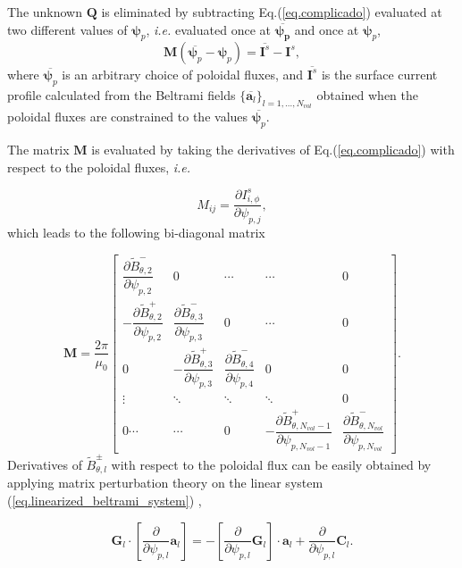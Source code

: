 The unknown $\mathbf{Q}$ is eliminated by subtracting Eq.(\ref{eq.complicado}) evaluated at two different values of $\bm{\psi}_p$, \textit{i.e.} evaluated once at $\overbar{\bm{\psi_p}}$ and once at $\bm{\psi}_p$,
\begin{equation}
    \mathbf{M} (\overbar{\bm{\psi}_p} - \bm{\psi}_p) = \overbar{\bm{I}^{s}} - \bm{I}^{s}, \label{eq.psip_diff}
\end{equation}
where $\overbar{\bm{\psi}_p}$ is an arbitrary choice of poloidal fluxes, and $\overbar{\bm{I}^s}$ is the surface current profile calculated from the Beltrami fields $\{\overbar{\mathbf{a}_l}\}_{l=1,\ldots,N_{vol}}$ obtained when the poloidal fluxes are constrained to the values $\overbar{\bm{\psi}_p}$.

The matrix $\mathbf{M}$ is evaluated by taking the derivatives of Eq.(\ref{eq.complicado}) with respect to the poloidal fluxes, \textit{i.e.}

\begin{equation}
    M_{ij} = \frac{\partial I^s_{i,\phi}}{\partial \psi_{p,j}},\label{eq.coef_M}
\end{equation}
which leads to the following bi-diagonal matrix

\begin{equation}
    \mathbf{M} = \frac{2\pi}{\mu_0} \begin{bmatrix}\dfrac{\partial \tilde{B}^-_{\theta,2}}{\partial{\psi_{p,2}}} & 0 & \cdots & \cdots  & 0 \\
    -\dfrac{\partial \tilde{B}^+_{\theta,2}}{\partial{\psi_{p,2}}} & \dfrac{\partial \tilde{B}^-_{\theta,3}}{\partial{\psi_{p,3}}} & 0  & \cdots & 0\\
    0 & -\dfrac{\partial \tilde{B}^+_{\theta,3}}{\partial{\psi_{p,3}}} & \dfrac{\partial \tilde{B}^-_{\theta,4}}{\partial{\psi_{p,4}}} & 0  & 0 \\
    \vdots & \ddots & \ddots  & \ddots & 0\\
    0 \cdots  & \cdots & 0 & -\dfrac{\partial \tilde{B}^+_{\theta,N_{vol}-1}}{\partial{\psi_{p,N_{vol}-1}}} & \dfrac{\partial \tilde{B}^-_{\theta,N_{vol}}}{\partial{\psi_{p,N_{vol}}}}\end{bmatrix}.\label{eq.matrix_M}
\end{equation}
Derivatives of $\tilde{B}^\pm_{\theta,l}$ with respect to the poloidal flux can be easily obtained by applying matrix perturbation theory on the linear system (\ref{eq.linearized_beltrami_system}) \citep{Hudson2012},

\begin{equation}
    \mathbf{G}_l \cdot \left[\frac{\partial}{\partial\psi_{p,l}}\mathbf{a}_l\right] = - \left[\frac{\partial}{\partial\psi_{p,l}}\mathbf{G}_l\right] \cdot \mathbf{a}_l + \frac{\partial}{\partial\psi_{p,l}}\mathbf{C}_l.\label{eq.perturbed_matrix}
\end{equation}

